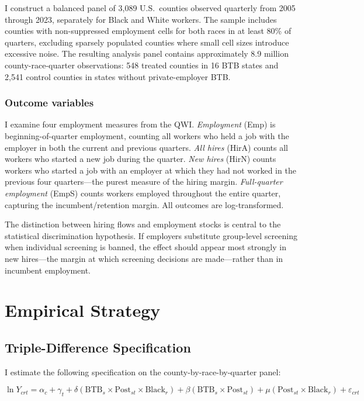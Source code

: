 \documentclass[12pt]{article}
\begin{document}
I construct a balanced panel of 3,089 U.S.\ counties observed quarterly from 2005 through 2023, separately for Black and White workers. The sample includes counties with non-suppressed employment cells for both races in at least 80\% of quarters, excluding sparsely populated counties where small cell sizes introduce excessive noise. The resulting analysis panel contains approximately 8.9 million county-race-quarter observations: 548 treated counties in 16 BTB states and 2,541 control counties in states without private-employer BTB.

\subsubsection*{Outcome variables} I examine four employment measures from the QWI. \textit{Employment} (Emp) is beginning-of-quarter employment, counting all workers who held a job with the employer in both the current and previous quarters. \textit{All hires} (HirA) counts all workers who started a new job during the quarter. \textit{New hires} (HirN) counts workers who started a job with an employer at which they had not worked in the previous four quarters---the purest measure of the hiring margin. \textit{Full-quarter employment} (EmpS) counts workers employed throughout the entire quarter, capturing the incumbent/retention margin. All outcomes are log-transformed.

The distinction between hiring flows and employment stocks is central to the statistical discrimination hypothesis. If employers substitute group-level screening when individual screening is banned, the effect should appear most strongly in new hires---the margin at which screening decisions are made---rather than in incumbent employment.




\section{Empirical Strategy}

\subsection{Triple-Difference Specification}

I estimate the following specification on the county-by-race-by-quarter panel:

\begin{equation}
\ln Y_{crt} = \alpha_c + \gamma_t + \delta(\text{BTB}_{s} \times \text{Post}_{st} \times \text{Black}_r) + \beta(\text{BTB}_{s} \times \text{Post}_{st}) + \mu(\text{Post}_{st} \times \text{Black}_r) + \varepsilon_{crt}
\label{eq:main}
\end{equation}
\end{document}
